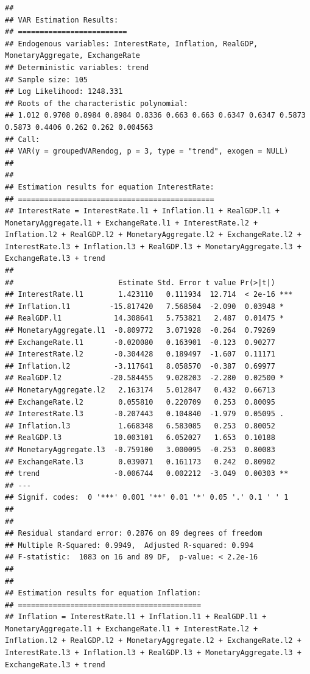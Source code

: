 \documentclass[11pt,preprint, authoryear]{elsarticle}
\numberwithin{equation}{section}
\numberwithin{figure}{section}
\numberwithin{table}{section}
\begin{document}
\begin{verbatim}
## 
## VAR Estimation Results:
## ========================= 
## Endogenous variables: InterestRate, Inflation, RealGDP, MonetaryAggregate, ExchangeRate 
## Deterministic variables: trend 
## Sample size: 105 
## Log Likelihood: 1248.331 
## Roots of the characteristic polynomial:
## 1.012 0.9708 0.8984 0.8984 0.8336 0.663 0.663 0.6347 0.6347 0.5873 0.5873 0.4406 0.262 0.262 0.004563
## Call:
## VAR(y = groupedVARendog, p = 3, type = "trend", exogen = NULL)
## 
## 
## Estimation results for equation InterestRate: 
## ============================================= 
## InterestRate = InterestRate.l1 + Inflation.l1 + RealGDP.l1 + MonetaryAggregate.l1 + ExchangeRate.l1 + InterestRate.l2 + Inflation.l2 + RealGDP.l2 + MonetaryAggregate.l2 + ExchangeRate.l2 + InterestRate.l3 + Inflation.l3 + RealGDP.l3 + MonetaryAggregate.l3 + ExchangeRate.l3 + trend 
## 
##                        Estimate Std. Error t value Pr(>|t|)    
## InterestRate.l1        1.423110   0.111934  12.714  < 2e-16 ***
## Inflation.l1         -15.817420   7.568504  -2.090  0.03948 *  
## RealGDP.l1            14.308641   5.753821   2.487  0.01475 *  
## MonetaryAggregate.l1  -0.809772   3.071928  -0.264  0.79269    
## ExchangeRate.l1       -0.020080   0.163901  -0.123  0.90277    
## InterestRate.l2       -0.304428   0.189497  -1.607  0.11171    
## Inflation.l2          -3.117641   8.058570  -0.387  0.69977    
## RealGDP.l2           -20.584455   9.028203  -2.280  0.02500 *  
## MonetaryAggregate.l2   2.163174   5.012847   0.432  0.66713    
## ExchangeRate.l2        0.055810   0.220709   0.253  0.80095    
## InterestRate.l3       -0.207443   0.104840  -1.979  0.05095 .  
## Inflation.l3           1.668348   6.583085   0.253  0.80052    
## RealGDP.l3            10.003101   6.052027   1.653  0.10188    
## MonetaryAggregate.l3  -0.759100   3.000095  -0.253  0.80083    
## ExchangeRate.l3        0.039071   0.161173   0.242  0.80902    
## trend                 -0.006744   0.002212  -3.049  0.00303 ** 
## ---
## Signif. codes:  0 '***' 0.001 '**' 0.01 '*' 0.05 '.' 0.1 ' ' 1
## 
## 
## Residual standard error: 0.2876 on 89 degrees of freedom
## Multiple R-Squared: 0.9949,  Adjusted R-squared: 0.994 
## F-statistic:  1083 on 16 and 89 DF,  p-value: < 2.2e-16 
## 
## 
## Estimation results for equation Inflation: 
## ========================================== 
## Inflation = InterestRate.l1 + Inflation.l1 + RealGDP.l1 + MonetaryAggregate.l1 + ExchangeRate.l1 + InterestRate.l2 + Inflation.l2 + RealGDP.l2 + MonetaryAggregate.l2 + ExchangeRate.l2 + InterestRate.l3 + Inflation.l3 + RealGDP.l3 + MonetaryAggregate.l3 + ExchangeRate.l3 + trend 

\end{verbatim}
\end{document}
